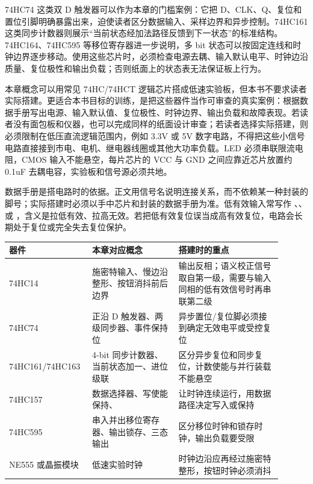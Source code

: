 \begin{chipcase}
74HC74 这类双 D 触发器可以作为本章的门槛案例：它把 D、CLK、Q、复位和置位引脚明确暴露出来，迫使读者区分数据输入、采样边界和异步控制。74HC161 这类同步计数器则展示“当前状态经加法路径反馈到下一状态”的标准结构。74HC164、74HC595 等移位寄存器进一步说明，多 bit 状态可以按固定连线和时钟边界逐步移动。使用这些芯片时，必须检查电源去耦、输入默认电平、时钟边沿质量、复位极性和输出负载；否则纸面上的状态表无法保证板上行为。
\end{chipcase}


本章概念可以用常见 74HC/74HCT 逻辑芯片搭成低速实验板，但本书不要求读者实际搭建。更适合本书目标的训练，是把这些器件当作可审查的真实案例：根据数据手册写出电源、输入默认值、复位极性、时钟边界、输出负载和故障表现。若读者没有面包板和仪器，也可以完成同样的纸面设计审查；若读者选择实际搭建，则必须限制在低压直流逻辑范围内，例如 3.3V 或 5V 数字电路，不得把这些小信号电路直接接到市电、电机、继电器线圈或其他大功率负载。LED 必须串联限流电阻，CMOS 输入不能悬空，每片芯片的 VCC 与 GND 之间应靠近芯片放置约 0.1uF 去耦电容，实验板和信号源必须共地。

数据手册是搭电路时的依据。正文用信号名说明连接关系，而不依赖某一种封装的脚号；实际搭建时必须以手中芯片和封装的数据手册为准。低有效输入常写作 、、 或 ，含义是拉低有效、拉高无效。若把低有效复位误当成高有效复位，电路会长期处于复位或完全失去复位保护。

\begin{longtable}{L{0.24\linewidth}L{0.3\linewidth}L{0.36\linewidth}}
\toprule
器件 & 本章对应概念 & 搭建时的重点 \\
\midrule
74HC14 & 施密特输入、慢边沿整形、按钮消抖前后边界 & 输出反相；语义校正信号取自第一级，需要与输入同相的低有效信号时再串联第二级 \\\tablerowrule
74HC74 & 正沿 D 触发器、两级同步器、事件保持位 & 异步置位/复位脚必须接到确定无效电平或受控复位 \\\tablerowrule
74HC161/74HC163 & 4-bit 同步计数器、当前状态加一、进位级联 & 区分异步复位和同步复位，计数使能与并行装载不能悬空 \\\tablerowrule
74HC157 & 数据选择器、写使能保持、 & 让时钟连续运行，用数据路径决定写入或保持 \\\tablerowrule
74HC595 & 串入并出移位寄存器、输出锁存、三态输出 & 区分移位时钟和锁存时钟，输出负载要受限 \\\tablerowrule
NE555 或晶振模块 & 低速实验时钟 & 时钟边沿应再经过施密特整形，按钮时钟必须消抖 \\
\bottomrule
\end{longtable}

